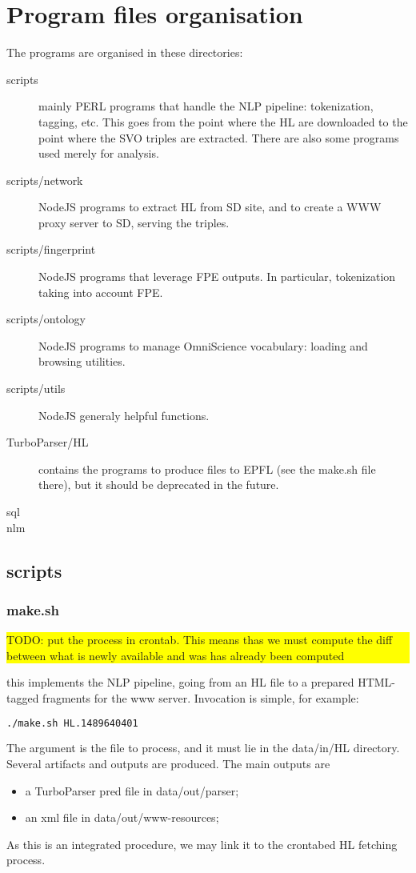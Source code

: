 \documentclass[a4paper,11pt]{report}
\newcommand{\TODO}[1]{\begin{center}\bfseries \colorbox{yellow}{\parbox{0.9\textwidth}{TODO: #1}}\end{center}}
\begin{document}
\section{Program files organisation}
The programs are organised in these directories:
\begin{description}
\item[scripts] mainly PERL programs that handle the NLP pipeline: tokenization, tagging, etc. This goes from the point where the HL are downloaded to the point where the SVO triples are extracted. There are also some programs used merely for analysis.
\item[scripts/network] NodeJS programs to extract HL from SD site, and to create a WWW proxy server to SD, serving the triples.
\item[scripts/fingerprint] NodeJS programs that leverage FPE outputs. In particular, tokenization taking into account FPE.
\item[scripts/ontology] NodeJS programs to manage OmniScience vocabulary: loading and browsing utilities.
\item[scripts/utils] NodeJS generaly helpful functions.
\item[TurboParser/HL] contains the programs to produce files to EPFL (see the make.sh file there), but it should be deprecated in the future.
\item[sql]
\item[nlm]
\end{description}
\subsection{scripts}
\subsubsection{make.sh}
\TODO{put the process in crontab. This means thas we must compute the diff between what is newly available and was has already been computed} 
this implements the NLP pipeline, going from an HL file to a prepared HTML-tagged fragments for the www server. Invocation is simple, for example:
%
\begin{lstlisting}[language=bash]
./make.sh HL.1489640401
\end{lstlisting}
%
The argument is the file to process, and it must lie in the data/in/HL directory. Several artifacts and outputs are produced. The main outputs are
%
\begin{itemize}
\item a TurboParser pred file in data/out/parser;
\item an xml file in data/out/www-resources;
\end{itemize}
%
As this is an integrated procedure, we may link it to the crontabed HL fetching process.
%
\end{document}
